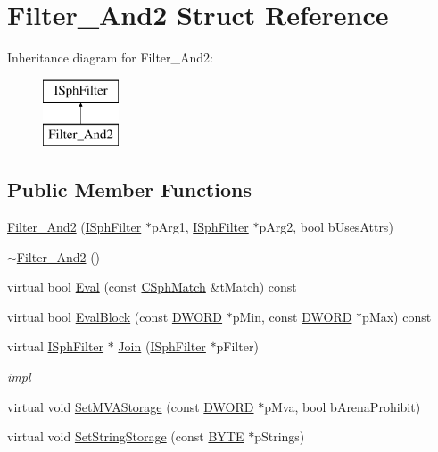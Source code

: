 \hypertarget{structFilter__And2}{\section{Filter\-\_\-\-And2 Struct Reference}
\label{structFilter__And2}
}
Inheritance diagram for Filter\-\_\-\-And2\-:\begin{figure}[H]
\begin{center}
\leavevmode
\includegraphics[height=2.000000cm]{structFilter__And2}
\end{center}
\end{figure}
\subsection*{Public Member Functions}
\begin{DoxyCompactItemize}
\item 
\hyperlink{structFilter__And2_a91394dc3842c3f4b6ce0139960819d57}{Filter\-\_\-\-And2} (\hyperlink{structISphFilter}{I\-Sph\-Filter} $\ast$p\-Arg1, \hyperlink{structISphFilter}{I\-Sph\-Filter} $\ast$p\-Arg2, bool b\-Uses\-Attrs)
\item 
\hyperlink{structFilter__And2_a7fbe1639fbf8991c0077960898b48633}{$\sim$\-Filter\-\_\-\-And2} ()
\item 
virtual bool \hyperlink{structFilter__And2_a201627530b757263e82fd77d044c3b5b}{Eval} (const \hyperlink{classCSphMatch}{C\-Sph\-Match} \&t\-Match) const 
\item 
virtual bool \hyperlink{structFilter__And2_a7f038137c18b8c3703747c0e283f11d1}{Eval\-Block} (const \hyperlink{sphinxstd_8h_a798af1e30bc65f319c1a246cecf59e39}{D\-W\-O\-R\-D} $\ast$p\-Min, const \hyperlink{sphinxstd_8h_a798af1e30bc65f319c1a246cecf59e39}{D\-W\-O\-R\-D} $\ast$p\-Max) const 
\item 
virtual \hyperlink{structISphFilter}{I\-Sph\-Filter} $\ast$ \hyperlink{structFilter__And2_a38282de2132cb02138b59b04ea41891e}{Join} (\hyperlink{structISphFilter}{I\-Sph\-Filter} $\ast$p\-Filter)
\begin{DoxyCompactList}\small\item\em impl \end{DoxyCompactList}\item 
virtual void \hyperlink{structFilter__And2_acd75826e1b146fb2bdff2c41b1317e24}{Set\-M\-V\-A\-Storage} (const \hyperlink{sphinxstd_8h_a798af1e30bc65f319c1a246cecf59e39}{D\-W\-O\-R\-D} $\ast$p\-Mva, bool b\-Arena\-Prohibit)
\item 
virtual void \hyperlink{structFilter__And2_a9dd14ead34d5d3d5c2fb451a62bd5844}{Set\-String\-Storage} (const \hyperlink{sphinxstd_8h_a4ae1dab0fb4b072a66584546209e7d58}{B\-Y\-T\-E} $\ast$p\-Strings)
\end{DoxyCompactItemize}
